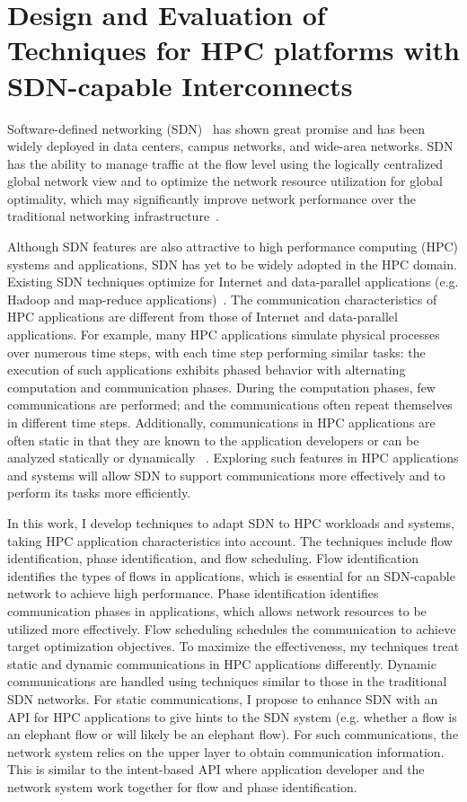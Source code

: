 \chapter{Design and Evaluation of Techniques for HPC platforms with SDN-capable Interconnects} 

Software-defined networking (SDN)~\cite{kreutz2014software} has shown great
promise and has been widely deployed in data centers, campus networks,
and wide-area networks. SDN has the ability to manage traffic at the flow
level using the logically centralized global network view and to optimize
the network resource utilization for global optimality, which may
significantly improve network performance over the traditional networking
infrastructure~\cite{tr2016sdn}.

Although SDN features are also attractive to high performance
computing (HPC) systems and applications, SDN has yet to be widely adopted
in the HPC domain. Existing SDN techniques optimize for Internet
and data-parallel applications (e.g. Hadoop and map-reduce
applications)~\cite{he2016firebird}. The communication characteristics of
HPC applications are different from those of Internet and data-parallel
applications. For example, many HPC applications simulate
physical processes over numerous time steps,
with each time step performing similar tasks: the execution of
such applications exhibits phased behavior with alternating computation
and communication phases. During the computation phases, few communications
are performed; and the communications often repeat themselves in
different time steps. Additionally,
communications in HPC applications are often static in that they are known
to the application developers or can be analyzed statically or dynamically
~\cite{faraj2002communication,hong2013achieving}. Exploring such features
in HPC applications and systems will allow SDN to support
communications more effectively and to perform its tasks more efficiently.

In this work, I develop techniques to adapt SDN to HPC workloads and systems,
taking HPC application characteristics into account. The techniques
include flow identification, phase identification, and flow scheduling.
Flow identification identifies the types of flows
in applications, which is essential
for  an SDN-capable network to achieve high performance.
Phase identification identifies communication phases in applications, which
allows network resources to be utilized more effectively. Flow scheduling
schedules the communication to achieve target optimization objectives.
To maximize the effectiveness, my techniques treat
static and dynamic communications in HPC applications differently.
Dynamic communications are handled using techniques similar to those
in the traditional SDN networks. For static communications, I propose
to enhance SDN with an API for HPC applications
to give hints to the SDN system (e.g. whether a flow is an elephant flow
or will likely be an elephant flow). For such communications,
the network system relies on the upper layer to obtain communication
information. This is similar to the intent-based API \cite{Coflow2012}
where application developer and the network system work
together for flow and phase identification.

